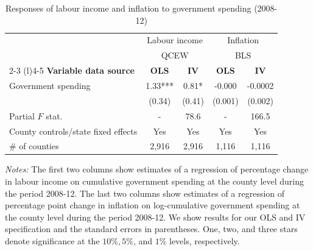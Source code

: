 \documentclass[\latexroot/\projectname]{subfiles}
\begin{document}
\begin{table}[h]
  \centering
  \caption{Responses of labour income and inflation to government spending (2008-12)\whenintegrated{\label{tab:qa-labour-income-inflation}}}
  \begin{tabular}{lcccc}
    \hline
     & \multicolumn{2}{c}{Labour income} & \multicolumn{2}{c}{Inflation} \\
     & \multicolumn{2}{c}{QCEW} & \multicolumn{2}{c}{BLS} \\
     \cmidrule(l){2-3} \cmidrule(l){4-5}
    \textbf{Variable data source} & \textbf{OLS} & \textbf{IV} & \textbf{OLS} & \textbf{IV} \\
    \hline
    Government spending & 1.33***  & 0.81*  & -0.000  & -0.0002  \\
     & (0.34)  & (0.41) & (0.001) & (0.002) \\
    Partial $F$ stat. & - & 78.6 & - & 166.5 \\
    County controls/state fixed effects & Yes & Yes & Yes & Yes \\
    \# of counties & 2,916 & 2,916 & 1,116 & 1,116 \\
    \hline
  \end{tabular}
  \begin{flushleft}
    \footnotesize
    \textit{Notes:} The first two columns show estimates of a regression of percentage change in labour income on cumulative government spending at the county level during the period 2008-12. The last two columns show estimates of a regression of percentage point change in inflation on log-cumulative government spending at the county level during the period 2008-12. We show results for our OLS and IV specification and the standard errors in parentheses. One, two, and three stars denote significance at the $10 \%, 5 \%$, and $1 \%$ levels, respectively.
  \end{flushleft}
\end{table}

\smartbib
\end{document}
